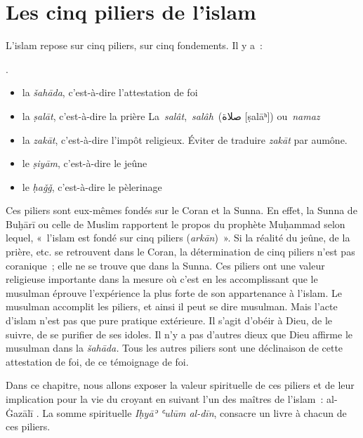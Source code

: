 \chapter{Les cinq piliers de l'islam}
\label{5pilliers}
L'islam repose sur cinq piliers, sur cinq fondements. Il y a~:

\begin{Def}.

\begin{itemize}
\item
  la \emph{šahāda}, c'est-à-dire l'attestation de foi
\item
  la \emph{ṣalāt}, c'est-à-dire la prière
  La~\emph{salât},~\emph{salâh}~(صلاة {[}ṣalāʰ{]}) ou~\emph{namaz}
\item
  la \emph{zakāt}, c'est-à-dire l'impôt religieux. Éviter de traduire
  \emph{zakāt} par aumône.
\item
  le \emph{ṣiyām}, c'est-à-dire le jeûne
\item
  le \emph{ḥaǧǧ}, c'est-à-dire le pèlerinage
\end{itemize}
\end{Def}

Ces piliers sont eux-mêmes fondés sur le Coran et la Sunna. En effet, la
Sunna de Buḫārī ou celle de Muslim rapportent le propos du prophète
Muḥammad selon lequel, «~l'islam est fondé sur cinq piliers
(\emph{arkān})~». Si la réalité du jeûne, de la prière, etc. se
retrouvent dans le Coran, la détermination de cinq piliers n'est pas
coranique~; elle ne se trouve que dans la Sunna. Ces piliers ont une
valeur religieuse importante dans la mesure où c'est en les
accomplissant que le musulman éprouve l'expérience la plus forte de son
appartenance à l'islam. Le musulman accomplit les piliers, et ainsi il
peut se dire musulman. Mais l'acte d'islam n'est pas que pure pratique
extérieure. Il s'agit d'obéir à Dieu, de le suivre, de se purifier de
ses idoles. Il n'y a pas d'autres dieux que Dieu affirme le musulman
dans la \emph{šahāda.} Tous les autres piliers sont une déclinaison de
cette attestation de foi, de ce témoignage de foi.

Dans ce chapitre, nous allons exposer la valeur spirituelle de ces
piliers et de leur implication pour la vie du croyant en suivant l'un
des maîtres de l'islam~: al-Ġazālī \label{theol:AlGazali10}. La somme spirituelle \emph{Iḥyāʾ
ʿulūm al-dīn}, consacre un livre à chacun de ces piliers.




